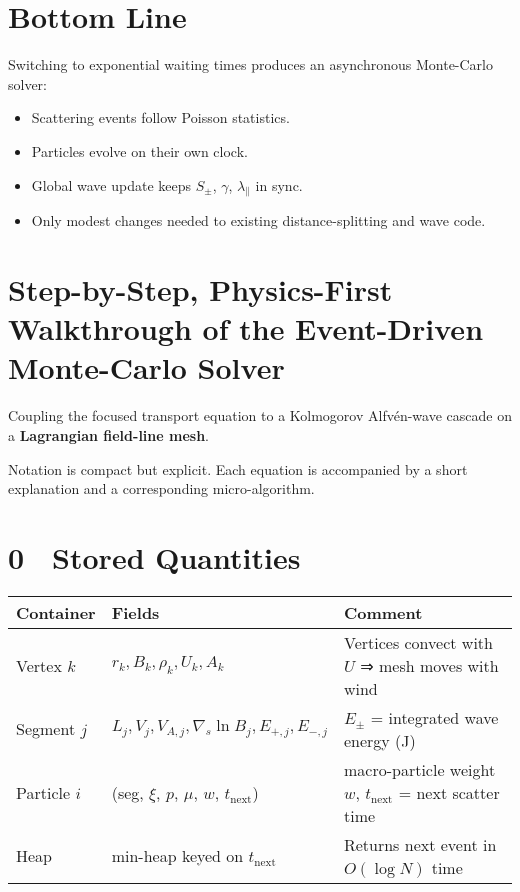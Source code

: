 {\section*{Bottom Line}

Switching to exponential waiting times produces an asynchronous Monte-Carlo solver:

\begin{itemize}
    \item Scattering events follow Poisson statistics.
    \item Particles evolve on their own clock.
    \item Global wave update keeps $S_\pm$, $\gamma$, $\lambda_\parallel$ in sync.
    \item Only modest changes needed to existing distance-splitting and wave code.
\end{itemize}


\section*{Step-by-Step, Physics-First Walkthrough of the Event-Driven Monte-Carlo Solver}

Coupling the focused transport equation to a Kolmogorov Alfvén-wave cascade on a \textbf{Lagrangian field-line mesh}.

Notation is compact but explicit. Each equation is accompanied by a short explanation and a corresponding micro-algorithm.

\section*{0 Stored Quantities}

\begin{tabular}{@{}lll@{}}
\toprule
\textbf{Container} & \textbf{Fields} & \textbf{Comment} \\
\midrule
Vertex $k$   & $r_k, B_k, \rho_k, U_k, A_k$ & Vertices convect with $U$ ⇒ mesh moves with wind \\
Segment $j$  & $L_j, V_j, V_{A,j}, \nabla_s\ln B_j, E_{+,j}, E_{-,j}$ & $E_\pm$ = integrated wave energy (J) \\
Particle $i$ & (seg, $\xi$, $p$, $\mu$, $w$, $t_{\text{next}}$) & macro-particle weight $w$, $t_{\text{next}}$ = next scatter time \\
Heap         & min-heap keyed on $t_{\text{next}}$ & Returns next event in $O(\log N)$ time \\
\bottomrule
\end{tabular}

}
